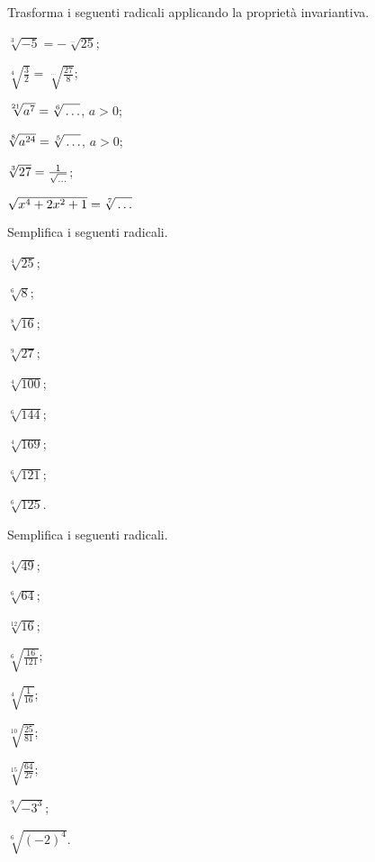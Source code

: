 \begin{esercizio}
\label{ese:2.23}
Trasforma i seguenti radicali applicando la proprietà invariantiva.
 \begin{multicols}{3}
 \begin{enumeratea}
 \item $\sqrt[3]{-5}=-\sqrt[\ldots]{25}$;
 \item $\sqrt[4]{\frac 3 2}=\sqrt[\ldots]{\frac{27} 8}$;
 \item $\sqrt[21]{a^7}=\sqrt[6]{\vphantom{4}\ldots}$, $a>0$;
 \item $\sqrt[8]{a^{24}}=\sqrt[5]{\vphantom{4}\ldots}$, $a>0$;
 \item $\sqrt[3]{27}=\frac 1{\sqrt{\vphantom{4}\ldots}}$;
 \item $\sqrt{x^4+2x^2+1}=\sqrt[7]{\vphantom{4}\ldots}$
 \end{enumeratea}
 \end{multicols}
\end{esercizio}

\begin{esercizio}[\Ast]
\label{ese:2.24}
Semplifica i seguenti radicali.
 \begin{multicols}{3}
 \begin{enumeratea}
 \item $\sqrt[4]{25}$;
 \item $\sqrt[6]8$;
 \item $\sqrt[8]{16}$;
 \item $\sqrt[9]{27}$;
 \item $\sqrt[4]{100}$;
 \item $\sqrt[6]{144}$;
 \item $\sqrt[4]{169}$;
 \item $\sqrt[6]{121}$;
 \item $\sqrt[6]{125}$.
 \end{enumeratea}
 \end{multicols}
\end{esercizio}

\begin{esercizio}[\Ast]
 \label{ese:2.25}
Semplifica i seguenti radicali.
 \begin{multicols}{3}
 \begin{enumeratea}
 \item $\sqrt[4]{49}$;
 \item $\sqrt[6]{64}$;
 \item $\sqrt[12]{16}$;
 \item $\sqrt[6]{\frac{16}{121}}$;
 \item $\sqrt[4]{\frac 1{16}}$;
 \item $\sqrt[10]{\frac{25}{81}}$;
 \item $\sqrt[15]{\frac{64}{27}}$;
 \item $\sqrt[9]{-3^3}$;
 \item $\sqrt[6]{(-2)^4}$.
 \end{enumeratea}
 \end{multicols}
\end{esercizio}


